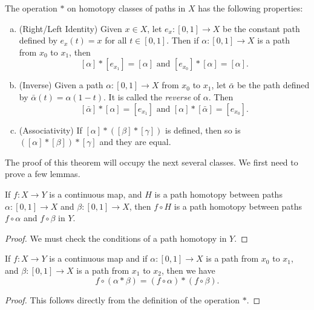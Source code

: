 \documentclass[noname]{notes}
\begin{document}
\begin{theorem}
\label{groupoid properties of path product}
	The operation $*$ on homotopy classes of paths in $X$ has the following properties: 
	\begin{enumerate}[(a)]
		\item (Right/Left Identity) Given $x \in X$, let $e_x \colon [0,1] \to X$ be the constant path defined by $e_x(t) = x$ for all $t \in [0,1]$. Then if $\alpha \colon [0,1] \to X$ is a path from $x_0$ to $x_1$, then 
		\[
			[\alpha] * [e_{x_1}] = [\alpha] \text{ and } [e_{x_0}] * [\alpha] = [\alpha]. 
		\]
		\item (Inverse) Given a path $\alpha \colon [0,1] \to X$ from $x_0$ to $x_1$, let $\bar \alpha$ be the path defined by $\bar \alpha(t) = \alpha(1-t)$. It is called the \textit{reverse} of $\alpha$. Then 
		\[
			[\bar \alpha] * [\alpha] = [e_{x_1}] \text{ and } [\alpha]*[\bar \alpha] = [e_{x_0}].
		\]
		\item (Associativity) If $[\alpha] * ([\beta] * [\gamma])$ is defined, then so is $([\alpha] * [\beta]) * [\gamma]$ and they are equal. 
	\end{enumerate}
\end{theorem}

The proof of this theorem will occupy the next several classes. We first need to prove a few lemmas. 

\begin{lemma}
\label{composing with homotopies}
	If $f \colon X \to Y$ is a continuous map, and $H$ is a path homotopy between paths $\alpha \colon [0,1] \to X$ and $\beta \colon [0,1] \to X$, then $f \circ H$ is a path homotopy between paths $f \circ \alpha$ and $f \circ \beta$ in $Y$. 
\end{lemma}

\begin{proof}
	We must check the conditions of a path homotopy in $Y$. 
\end{proof}

\begin{lemma}
\label{composing paths with functions}
	If $f \colon X \to Y$ is a continuous map and if $\alpha \colon [0,1] \to X$ is a path from $x_0$ to $x_1$, and $\beta \colon [0,1] \to X$ is a path from $x_1$ to $x_2$, then we have
	\[
		f \circ (\alpha * \beta) = (f \circ \alpha) * (f \circ \beta). 
	\]
\end{lemma}

\begin{proof}
	This follows directly from the definition of the operation $*$. 
\end{proof}
\end{document}
